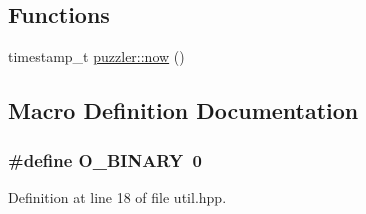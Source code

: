 \subsection*{Functions}
\begin{DoxyCompactItemize}
\item 
timestamp\+\_\+t \hyperlink{a00145_ae62a97adb4ed5ad6141e879eb6505a5f}{puzzler\+::now} ()
\end{DoxyCompactItemize}


\subsection{Macro Definition Documentation}
\hypertarget{a00127_a36fa9b2e726512bc17a7a6d3e39002be}{}
\subsubsection[{O\+\_\+\+B\+I\+N\+A\+R\+Y}]{\setlength{\rightskip}{0pt plus 5cm}\#define O\+\_\+\+B\+I\+N\+A\+R\+Y~0}\label{a00127_a36fa9b2e726512bc17a7a6d3e39002be}


Definition at line 18 of file util.\+hpp.

